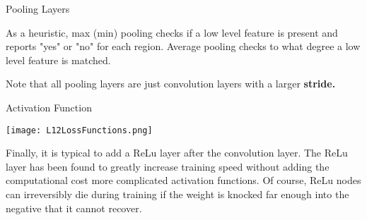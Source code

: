 \documentclass[10pt, table, dvipsnames,xcdraw, handout]{beamer}
\def\layersep{2.5cm}
\begin{document}
\begin{frame}[fragile]{Pooling Layers}
  \begin{minipage}[t][0.5\textheight][t]{\textwidth}\centering
{}
  \end{minipage}
  \vfill
\begin{minipage}[t][0.5\textheight][t]{\textwidth}
As a heuristic, max (min) pooling checks if a low level feature is present and reports "yes" or "no" for each region. Average pooling checks to what degree a low level feature is matched. \pause

Note that all pooling layers are just convolution layers with a larger \textbf{stride.}
\end{minipage}
\end{frame}





\begin{frame}[fragile]{Activation Function}
  \begin{minipage}[t][0.5\textheight][t]{\textwidth}\centering
	\centering \texttt{[image: L12LossFunctions.png]} 
  \end{minipage}
  \vfill
\begin{minipage}[t][0.5\textheight][t]{\textwidth}
Finally, it is typical to add a ReLu layer after the convolution layer. The ReLu layer has been found to greatly increase training speed without adding the computational cost more complicated activation functions. Of course, ReLu nodes can irreversibly die during training if the weight is knocked far enough into the negative that it cannot recover. 
\end{minipage}
\end{frame}
\end{document}
